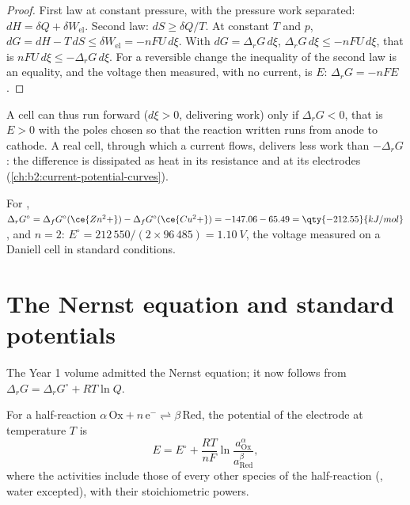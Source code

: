 \begin{proof}
First law at constant pressure, with the pressure work separated:
$dH = \delta Q + \delta W_{\text{el}}$. Second law: $dS \geq \delta Q/T$. At
constant $T$ and $p$, $dG = dH - T\,dS \leq \delta W_{\text{el}} = -nFU\,d\xi$.
With $dG = \Delta_r G\,d\xi$, $\Delta_r G\,d\xi \leq -nFU\,d\xi$, that is
$nFU\,d\xi \leq -\Delta_r G\,d\xi$. For a reversible change the inequality
of the second law is an equality, and the voltage then measured, with no
current, is $E$: $\Delta_r G = -nFE$.
\end{proof}

A cell can thus run forward ($d\xi > 0$, delivering work) only if $\Delta_r G <
0$, that is $E > 0$ with the poles chosen so that the reaction written runs
from anode to cathode. A real cell, through which a current flows, delivers
less work than $-\Delta_r G$: the difference is dissipated as heat in its
resistance and at its electrodes (\cref{ch:b2:current-potential-curves}).

\begin{example}\label{ex:b2:cell-thermodynamics:daniell}
For , $\Delta_r G^\circ = \Delta_f G^\circ(\ce{Zn^2+}) -
\Delta_f G^\circ(\ce{Cu^2+}) = -147.06 - 65.49 = \qty{-212.55}{kJ/mol}$, and $n = 2$:
$E^\circ = 212\,550/(2 \times 96\,485) = \qty{1.10}{V}$, the voltage measured on a
Daniell cell in standard conditions.
\end{example}

\section{The Nernst equation and standard potentials}

The Year 1 volume admitted the Nernst equation; it now follows from
$\Delta_r G = \Delta_r G^\circ + RT\ln Q$.

\begin{theorem}\label{thm:b2:cell-thermodynamics:nernst-derived}
For a half-reaction $\alpha\,\mathrm{Ox} + n\,\mathrm e^- \rightleftharpoons
\beta\,\mathrm{Red}$, the potential of the electrode at temperature $T$ is
\[
  E = E^\circ + \frac{RT}{nF}\ln\frac{a_{\mathrm{Ox}}^{\alpha}}{a_{\mathrm{Red}}^{\beta}} ,
\]
where the activities include those of every other species of the
half-reaction (, water excepted), with their stoichiometric powers.
\end{theorem}


